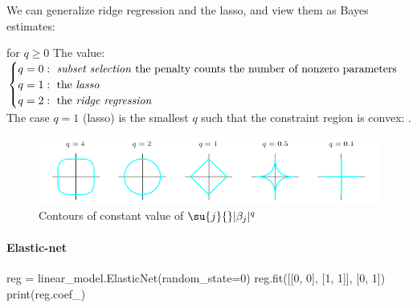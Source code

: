 We can generalize ridge regression and the lasso, and view them as 
Bayes estimates:
\begin{center}
\end{center}
for $q\geq 0$
The value:
$
\begin{cases}
	q=0:\text{ \emph{subset selection} the penalty
	counts the number of nonzero parameters}\\
	q=1:\text{ the \emph{lasso}}\\
	q=2:\text{ the \emph{ridge regression}}
\end{cases}
$\\
The case $q=1$ (lasso) is the smallest $q$ such that the constraint
region is convex: .
\begin{figure}[H]
	\begin{center}
		\includegraphics[width=.7\textwidth]{./chap/1chap/5sec/images/5_penaltyContours.png}
	\end{center}
	\caption{Contours of constant value of 
	$\su{j}{}|\beta_{j}|^{q}$}
	\label{fig:5.5_penaltyContours}
\end{figure}
\paragraph{Elastic-net}
\begin{center}
\end{center}
\begin{python}
reg = linear_model.ElasticNet(random_state=0)
reg.fit([[0, 0], [1, 1]], [0, 1])
print(reg.coef_)
\end{python}

